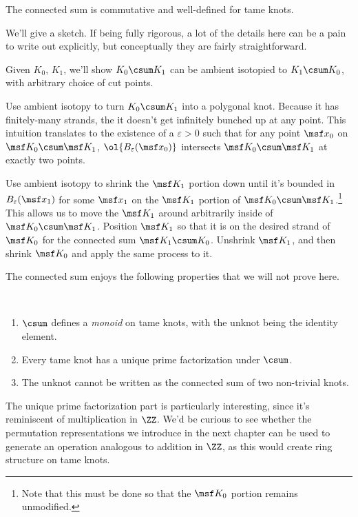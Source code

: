 \begin{proposition}
  The connected sum is commutative and well-defined for tame knots.
\end{proposition}
We'll give a sketch. If being fully rigorous, a lot of the details
here can be a pain to write out explicitly, but conceptually they are
fairly straightforward.
\begin{sproof}[Sketch]
  Given $K_0$, $K_1$, we'll show $K_0 \csum K_1$ can be ambient
  isotopied to $K_1 \csum K_0$, with arbitrary choice of cut points.

  Use ambient isotopy to turn $K_0 \csum K_1$ into a polygonal knot.
  Because it has finitely-many strands, the it doesn't get infinitely
  bunched up at any point. This intuition translates to the existence
  of a $\varepsilon > 0$ such that for any point $\msf x_0$ on $\msf
  K_0 \csum \msf K_1$, $\ol{B_{\varepsilon}(\msf x_0)}$ intersects
  $\msf K_0 \csum \msf K_1$ at exactly two points.

  Use ambient isotopy to shrink the $\msf K_1$ portion down until it's
  bounded in $B_\varepsilon(\msf x_1)$ for some $\msf x_1$ on the
  $\msf K_1$ portion of $\msf K_0 \csum \msf K_1$.\footnote{Note that
    this must be done so that the $\msf K_0$ portion remains
    unmodified.} This allows us to move the $\msf K_1$ around
  arbitrarily inside of $\msf K_0 \csum \msf K_1$. Position $\msf K_1$
  so that it is on the desired strand of $\msf K_0$ for the connected
  sum $\msf K_1 \csum K_0$. Unshrink $\msf K_1$, and then shrink $\msf
  K_0$ and apply the same process to it.
\end{sproof}
The connected sum enjoys the following properties that we will not
prove here.
\begin{proposition}~
  \begin{enumerate}
    \item $\csum$ defines a \emph{monoid} on tame knots, with the
      unknot being the identity element.
    \item Every tame knot has a unique prime factorization under
      $\csum$.
    \item The unknot cannot be written as the connected sum of two
      non-trivial knots.
  \end{enumerate}
\end{proposition}
The unique prime factorization part is particularly interesting, since
it's reminiscent of multiplication in $\ZZ$. We'd be curious to see
whether the permutation representations we introduce in the next
chapter can be used to generate an operation analogous to addition in
$\ZZ$, as this would create ring structure on tame knots.



